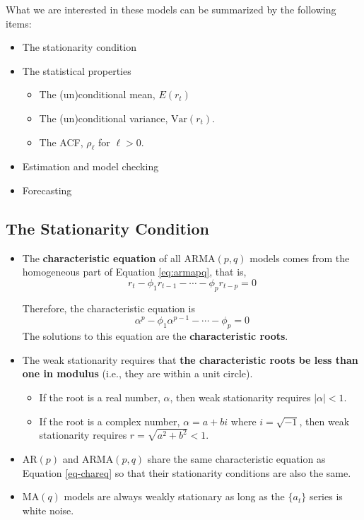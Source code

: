 \documentclass[a4paper,11pt]{article}
\newcommand{\var}{\mathrm{Var}}
\begin{document}
What we are interested in these models can be summarized by the
following items:
\begin{itemize}
\item The stationarity condition
\item The statistical properties
\begin{itemize}
\item The (un)conditional mean, \(E(r_t)\)
\item The (un)conditional variance, \(\var(r_t)\).
\item The ACF, \(\rho_{\ell}\) for \(\ell > 0\).
\end{itemize}
\item Estimation and model checking
\item Forecasting
\end{itemize}


\subsection{The Stationarity Condition}
\label{sec:org66c3c13}

\begin{itemize}
\item The \textbf{characteristic equation} of all \(\mathrm{ARMA}(p, q)\) models
comes from the homogeneous part of Equation \eqref{eq:armapq}, that
is, 
\[ r_t - \phi_1 r_{t-1} - \cdots - \phi_p r_{t-p} = 0  \]

Therefore, the characteristic equation is
\begin{equation}
\label{eq-chareq}
\alpha^p - \phi_1 \alpha^{p-1} - \cdots - \phi_p = 0
\end{equation}
The solutions to this equation are the \textbf{characteristic roots}.

\item The weak stationarity requires that \textbf{the characteristic roots be less
than one in modulus} (i.e., they are within a unit circle).
\begin{itemize}
\item If the root is a real number, \(\alpha\), then weak stationarity
requires \(|\alpha| < 1\).
\item If the root is a complex number, \(\alpha = a + bi\) where \(i =
    \sqrt{-1}\), then weak stationarity requires \(r = \sqrt{a^2 + b^2} < 1\).
\end{itemize}

\item \(\mathrm{AR}(p)\) and \(\mathrm{ARMA}(p,q)\) share the same
characteristic equation as Equation \eqref{eq-chareq} so that their
stationarity conditions are also the same.

\item \(\mathrm{MA}(q)\) models are always weakly stationary as long as the
\(\{a_t\}\) series is white noise.
\end{itemize}
\end{document}
